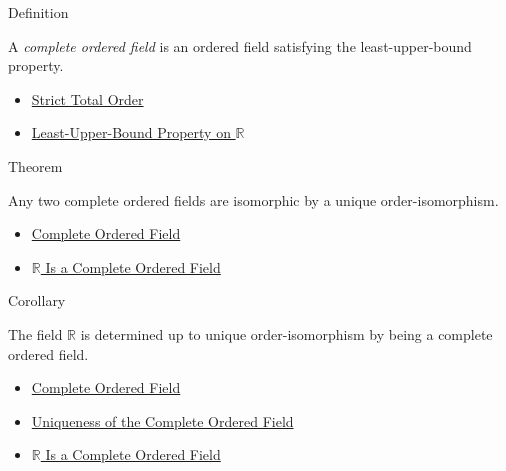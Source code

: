 \begin{definitionbox}{Definition}
\begin{definition}
\label{def:real-ordered-field}
A \emph{complete ordered field} is an ordered field satisfying the
least-upper-bound property.
\end{definition}
\end{definitionbox}

\begin{dependencies}
\begin{itemize}
  \item \hyperref[def:strict-total-order]{Strict Total Order}
  \item \hyperref[def:least-upper-bound-property-on-r]{Least-Upper-Bound Property on $\mathbb{R}$}
\end{itemize}
\end{dependencies}

\begin{theorembox}{Theorem}
\begin{theorem}
\label{thm:uniqueness-of-cof}
Any two complete ordered fields are isomorphic by a unique order-isomorphism.
\end{theorem}
\end{theorembox}

\begin{dependencies}
\begin{itemize}
  \item \hyperref[def:real-ordered-field]{Complete Ordered Field}
  \item \hyperref[thm:r-is-complete-ordered-field]{$\mathbb{R}$ Is a Complete Ordered Field}
\end{itemize}
\end{dependencies}

\begin{corollarybox}{Corollary}
\begin{corollary}
\label{cor:r-is-the-reals}
The field $\mathbb{R}$ is determined up to unique order-isomorphism by being a
complete ordered field.
\end{corollary}
\end{corollarybox}

\begin{dependencies}
\begin{itemize}
  \item \hyperref[def:real-ordered-field]{Complete Ordered Field}
  \item \hyperref[thm:uniqueness-of-cof]{Uniqueness of the Complete Ordered Field}
  \item \hyperref[thm:r-is-complete-ordered-field]{$\mathbb{R}$ Is a Complete Ordered Field}
\end{itemize}
\end{dependencies}
